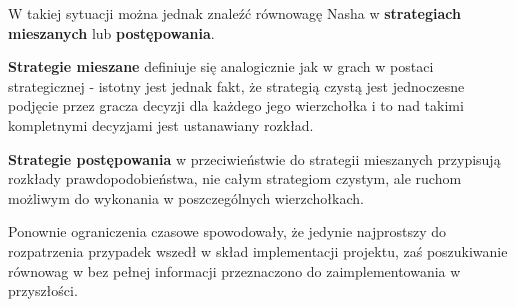 \documentclass[polish]{standalone}
\begin{document}
W takiej sytuacji można jednak znaleźć równowagę Nasha w \textbf{strategiach mieszanych} lub \textbf{postępowania}.

\begin{definition}
\textbf{Strategie mieszane} definiuje się analogicznie jak w grach w postaci strategicznej - istotny jest jednak fakt,
że strategią czystą jest jednoczesne podjęcie przez gracza decyzji dla każdego jego wierzchołka i to nad takimi
kompletnymi decyzjami jest ustanawiany rozkład.
\end{definition}

\begin{definition}
\textbf{Strategie postępowania} w przeciwieństwie do strategii mieszanych przypisują rozkłady
prawdopodobieństwa, nie całym strategiom czystym, ale ruchom możliwym do wykonania w poszczególnych wierzchołkach.
\cite[str.~83]{FT-GT}
\end{definition}

Ponownie ograniczenia czasowe spowodowały, że jedynie najprostszy do rozpatrzenia przypadek wszedł w skład implementacji
projektu, zaś poszukiwanie równowag w bez pełnej informacji przeznaczono do zaimplementowania w przyszłości.
\end{document}
